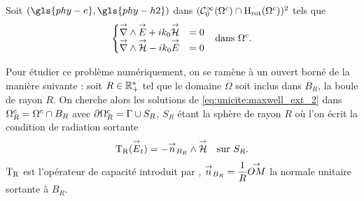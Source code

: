   Soit \((\gls{phy-e},\gls{phy-h2})\) dans \((\mathcal{C}_0^\infty(\Omega^c)\cap\mathrm{H}_\mathrm{rot}(\Omega^c))^2\) tels que
  \begin{align}
  \left\lbrace
    \begin{matrix}
      {\overset{\rightarrow}{\nabla}}\wedge {\overset{\rightarrow}{E}} + i k_0 {\overset{\rightarrow}{\mathcal{H}}} &= 0
      \\
      {\overset{\rightarrow}{\nabla}}\wedge {\overset{\rightarrow}{\mathcal{H}}} - i k_0 {\overset{\rightarrow}{E}} &= 0
    \end{matrix}
    \right. && \text{dans \(\Omega^c\).}
    \label{eq:unicite:maxwell_ext_2}
  \end{align}


  Pour étudier ce problème numériquement, on se ramène à un ouvert borné de la manière suivante : soit \(R\in\mathbb R_+^*\) tel que le domaine \(\overline{\Omega}\) soit inclus dans \(B_R\), la boule de rayon \(R\).
  On cherche alors les solutions de \eqref{eq:unicite:maxwell_ext_2} dans \(\Omega^c_R=\Omega^c\cap B_R\) avec \(\partial\Omega^c_R = \Gamma\cup S_R\), \(S_R\) étant la sphère de rayon \(R\) où l'on écrit la condition de radiation sortante
  \begin{equation}
    \label{eq:unicite:TR}
    \begin{aligned}
      \operatorname{T_R}({\overset{\rightarrow}{E}}_t) = - {\overset{\rightarrow}{n}}_{B_R} \wedge {\overset{\rightarrow}{\mathcal{H}}} && \text{sur \(S_R\).}
    \end{aligned}
  \end{equation}
  \(\operatorname{T_R}\) est l'opérateur de capacité introduit par \cite[p.~200]{nedelec_acoustic_2001}, \({\overset{\rightarrow}{n}}_{B_R}=\dfrac{1}{R}{\overset{\rightarrow}{OM}}\) la normale unitaire sortante à \(B_R\).

